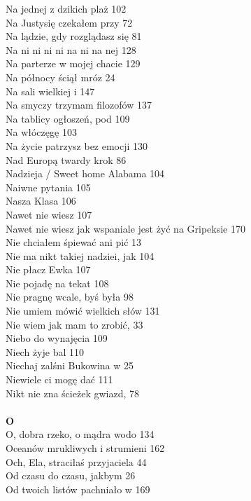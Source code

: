 \documentclass[a5paper, 10pt]{book}
\begin{document}
{\begin{multicols}{3}
    Na jednej z dzikich plaż 102\\
    Na Justysię czekałem przy 72\\
    Na lądzie, gdy rozglądasz się 81\\
    Na ni ni ni ni na ni na nej 128\\
    Na parterze w mojej chacie 129\\
    Na północy ściął mróz 24\\
    Na sali wielkiej i 147\\
    Na smyczy trzymam filozofów 137\\
    Na tablicy ogłoszeń, pod 109\\
    Na włóczęgę 103\\
    Na życie patrzysz bez emocji 130\\
    Nad Europą twardy krok 86\\
    Nadzieja / Sweet home Alabama 104\\
    Naiwne pytania 105\\
    Nasza Klasa 106\\
    Nawet nie wiesz 107\\
    Nawet nie wiesz jak wspaniale jest żyć na Gripeksie 170\\
    Nie chciałem śpiewać ani pić 13\\
    Nie ma nikt takiej nadziei, jak 104\\
    Nie płacz Ewka 107\\
    Nie pojadę na tekat 108\\
    Nie pragnę wcale, byś była 98\\
    Nie umiem mówić wielkich słów 131\\
    Nie wiem jak mam to zrobić, 33\\
    Niebo do wynajęcia 109\\
    Niech żyje bal 110\\
    Niechaj zalśni Bukowina w 25\\
    Niewiele ci mogę dać 111\\
    Nikt nie zna ścieżek gwiazd, 78\\
    \\
    {\footnotesize \textbf{O\\} }
    O, dobra rzeko, o mądra wodo 134\\
    Oceanów mrukliwych i strumieni 162\\
    Och, Ela, straciłaś przyjaciela 44\\
    Od czasu do czasu, jakbym 26\\
    Od twoich listów pachniało w 169\\

\end{multicols}}
\end{document}
